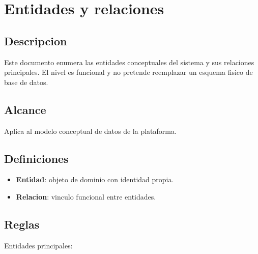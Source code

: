 \section{Entidades y relaciones}

\subsection{Descripcion}

Este documento enumera las entidades conceptuales del sistema y sus relaciones principales. El nivel es funcional y no pretende reemplazar un esquema fisico de base de datos.

\subsection{Alcance}

Aplica al modelo conceptual de datos de la plataforma.

\subsection{Definiciones}

\begin{itemize}
  \item \textbf{Entidad}: objeto de dominio con identidad propia.
  \item \textbf{Relacion}: vinculo funcional entre entidades.
\end{itemize}

\subsection{Reglas}

Entidades principales:

